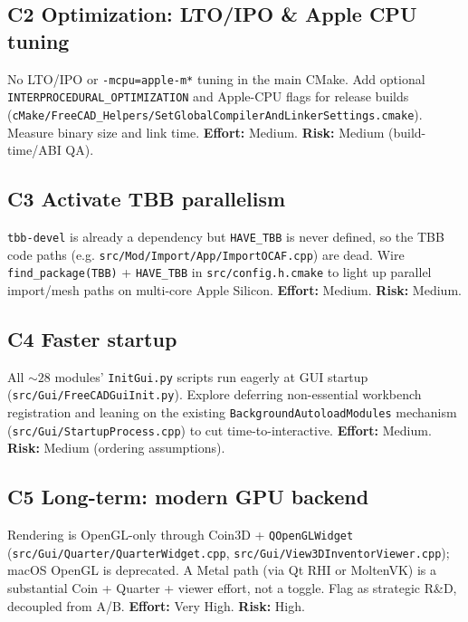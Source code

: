 \documentclass[11pt]{article}
\begin{document}
\subsection{C2 \textemdash{} Optimization: LTO/IPO \& Apple CPU tuning}
No LTO/IPO or \texttt{-mcpu=apple-m*} tuning in the main CMake. Add optional
\texttt{INTERPROCEDURAL\_OPTIMIZATION} and Apple-CPU flags for release builds
(\texttt{cMake/FreeCAD\_Helpers/SetGlobalCompilerAndLinkerSettings.cmake}). Measure
binary size and link time.
\textbf{Effort:} Medium. \quad\textbf{Risk:} Medium (build-time/ABI QA).

\subsection{C3 \textemdash{} Activate TBB parallelism}
\texttt{tbb-devel} is already a dependency but \texttt{HAVE\_TBB} is never defined, so the
TBB code paths (e.g. \texttt{src/Mod/Import/App/ImportOCAF.cpp}) are dead. Wire
\texttt{find\_package(TBB)} + \texttt{HAVE\_TBB} in \texttt{src/config.h.cmake} to light up
parallel import/mesh paths on multi-core Apple Silicon.
\textbf{Effort:} Medium. \quad\textbf{Risk:} Medium.

\subsection{C4 \textemdash{} Faster startup}
All ${\sim}28$ modules' \texttt{InitGui.py} scripts run eagerly at GUI startup
(\texttt{src/Gui/FreeCADGuiInit.py}). Explore deferring non-essential workbench
registration and leaning on the existing \texttt{BackgroundAutoloadModules} mechanism
(\texttt{src/Gui/StartupProcess.cpp}) to cut time-to-interactive.
\textbf{Effort:} Medium. \quad\textbf{Risk:} Medium (ordering assumptions).

\subsection{C5 \textemdash{} Long-term: modern GPU backend}
Rendering is OpenGL-only through Coin3D + \texttt{QOpenGLWidget}
(\texttt{src/Gui/Quarter/QuarterWidget.cpp}, \texttt{src/Gui/View3DInventorViewer.cpp});
macOS OpenGL is deprecated. A Metal path (via Qt RHI or MoltenVK) is a substantial
Coin + Quarter + viewer effort, not a toggle. Flag as strategic R\&D, decoupled
from A/B.
\textbf{Effort:} Very High. \quad\textbf{Risk:} High.

\end{document}

